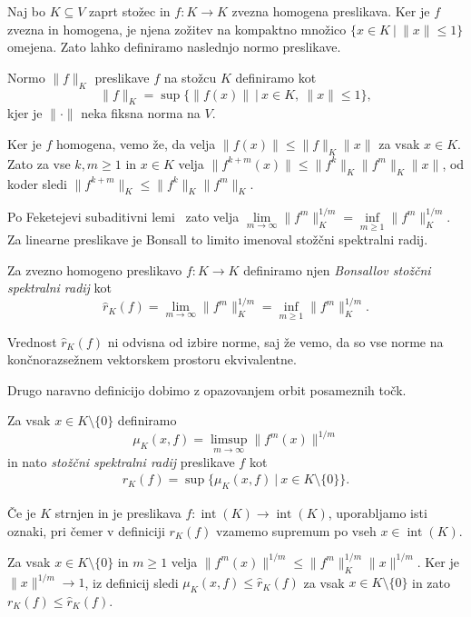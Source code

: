 \documentclass[mat2, tisk]{fmfdelo}
\begin{document}
Naj bo $K\subseteq V$ zaprt stožec in
$f\colon K\longrightarrow K$ zvezna homogena preslikava. Ker je $f$ zvezna in homogena, 
je njena zožitev na kompaktno množico $\{x\in K ~|~ \|x\|\leq1\}$ omejena.
Zato lahko definiramo naslednjo normo preslikave.

\begin{definicija}
  Normo $\|f\|_K$ preslikave $f$ na stožcu $K$ definiramo kot
  \[\|f\|_K=\sup\{\|f(x)\| ~|~ x\in K,\ \|x\|\leq1\},\] kjer je
  $\|\cdot\|$ neka fiksna norma na $V$.
\end{definicija}

Ker je $f$ homogena, vemo že, da velja
$\|f(x)\|\leq\|f\|_K\|x\|$ za vsak $x\in K$. Zato za vse
$k,m\geq1$ in $x\in K$ velja
$\|f^{k+m}(x)\|\leq\|f^k\|_K\|f^m\|_K\|x\|$, od koder sledi
$\|f^{k+m}\|_K\leq\|f^k\|_K\|f^m\|_K$.

Po Feketejevi subaditivni lemi~\cite{Fekete1923} zato velja
$\lim\limits_{m\to\infty}\|f^m\|_K^{1/m}
=\inf\limits_{m\geq1}\|f^m\|_K^{1/m}$.
Za linearne preslikave je Bonsall to limito imenoval stožčni
spektralni radij. 

\begin{definicija}
  Za zvezno homogeno preslikavo
  $f\colon K\longrightarrow K$ definiramo njen
  \emph{Bonsallov stožčni spektralni radij} kot
  \[\widehat r_K(f)=\lim\limits_{m\to\infty}\|f^m\|_K^{1/m}=\inf_{m\geq1}\|f^m\|_K^{1/m}.\]
\end{definicija}

Vrednost $\widehat r_K(f)$ ni odvisna od izbire norme, saj že vemo, da so vse
norme na končnorazsežnem vektorskem prostoru ekvivalentne.

Drugo naravno definicijo dobimo z opazovanjem orbit posameznih točk.

\begin{definicija}
  Za vsak $x\in K\setminus\{0\}$ definiramo
  \[\mu_K(x,f)=\limsup_{m\to\infty}\|f^m(x)\|^{1/m}\]
  in nato \emph{stožčni spektralni radij} preslikave $f$ kot
  \begin{align*}
  r_K(f)
  =
  \sup\{\mu_K(x,f) ~|~ x\in K\setminus\{0\}\}.
  \end{align*}

  Če je $K$ strnjen in je preslikava
  $f\colon\operatorname{int}(K)\longrightarrow\operatorname{int}(K)$,
  uporabljamo isti oznaki, pri čemer v definiciji
  $r_K(f)$ vzamemo supremum po vseh
  $x\in\operatorname{int}(K)$.
\end{definicija}


Za vsak $x\in K\setminus\{0\}$ in $m\geq1$ velja
$\|f^m(x)\|^{1/m}\leq\|f^m\|_K^{1/m}\|x\|^{1/m}$.
Ker je $\|x\|^{1/m}\longrightarrow1$, iz definicij sledi
$\mu_K(x,f)\leq\widehat r_K(f)$ za vsak $x\in K\setminus\{0\}$ in zato
$r_K(f)\leq\widehat r_K(f)$.
\end{document}
